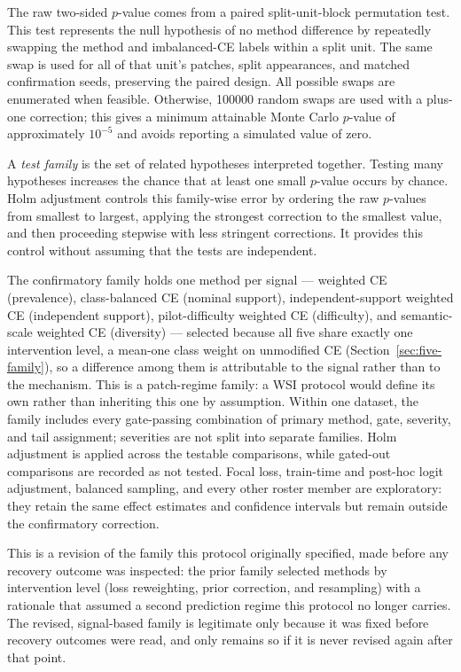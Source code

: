 \documentclass[11pt]{article}
\begin{document}
The raw two-sided $p$-value comes from a paired split-unit-block permutation test. This test represents the null hypothesis of no method difference by repeatedly swapping the method and imbalanced-CE labels within a split unit. The same swap is used for all of that unit's patches, split appearances, and matched confirmation seeds, preserving the paired design. All possible swaps are enumerated when feasible. Otherwise, \num{100000} random swaps are used with a plus-one correction; this gives a minimum attainable Monte Carlo $p$-value of approximately $10^{-5}$ and avoids reporting a simulated value of zero.

A \emph{test family} is the set of related hypotheses interpreted together. Testing many hypotheses increases the chance that at least one small $p$-value occurs by chance. Holm adjustment controls this family-wise error by ordering the raw $p$-values from smallest to largest, applying the strongest correction to the smallest value, and then proceeding stepwise with less stringent corrections. It provides this control without assuming that the tests are independent.

The confirmatory family holds one method per signal --- weighted CE (prevalence), class-balanced CE (nominal support), independent-support weighted CE (independent support), pilot-difficulty weighted CE (difficulty), and semantic-scale weighted CE (diversity) --- selected because all five share exactly one intervention level, a mean-one class weight on unmodified CE (Section~\ref{sec:five-family}), so a difference among them is attributable to the signal rather than to the mechanism. This is a patch-regime family: a WSI protocol would define its own rather than inheriting this one by assumption. Within one dataset, the family includes every gate-passing combination of primary method, gate, severity, and tail assignment; severities are not split into separate families. Holm adjustment is applied across the testable comparisons, while gated-out comparisons are recorded as not tested. Focal loss, train-time and post-hoc logit adjustment, balanced sampling, and every other roster member are exploratory: they retain the same effect estimates and confidence intervals but remain outside the confirmatory correction.

This is a revision of the family this protocol originally specified, made before any recovery outcome was inspected: the prior family selected methods by intervention level (loss reweighting, prior correction, and resampling) with a rationale that assumed a second prediction regime this protocol no longer carries. The revised, signal-based family is legitimate only because it was fixed before recovery outcomes were read, and only remains so if it is never revised again after that point.
\end{document}
